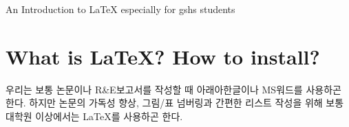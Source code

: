 \documentclass[11pt]{article}
\renewcommand\thesection{\Roman{section}.} %
\renewcommand\thesubsection{\arabic{subsection}.} %
\newtheorem{praise}{찬양}
\begin{document}
\begin{center}
	\Large An Introduction to \LaTeX 
	\small especially for gshs students
\end{center}

\begin{abstract}
	\LaTeX practice during August 2nd $\sim$ 4th. Special thanks to HLETRD.
	
	\begin{large}
	An-Introduction-to-LaTeX
	논문작성을 위한 LaTeX 입문서를 LaTeX로 제작한 것입니다.
	
	LaTeX Editor로는 TeXstudio를 추천합니다. 개인적으로 쓰고 있는 것이기도 해서...
	
	http://www.texstudio.org/
	
	TeXworks쓰다가 TeXstudio쓰면 정말 내가 왜 이걸 모르고 있었지 싶음...
	
	TeX에서 한글을 사용하기 위해서는 koTeXlive를 별도로 설치해야 합니다.
	
	www.ktug.org/xe/index.php?mid=install
	
	용량이 1GB정도 되니 주의 바람\\
	\end{large}
	
	
	\begin{praise}
		HLETRD는 31기 선배들 중 \LaTeX 의 최고수이시다.
		저희 32기에게 처음 \LaTeX 를 가르쳐 주시고 class 파일도 만들어주신 정민석 선생님께 감사드립니다.\\
	\end{praise}
	
	
	\textbf{우리의 기초 R\&E는 수학 R\&E가 아닌 LaTeX R\&E이었습니다.}\\
	\begin{flushright}
		-익명
	\end{flushright}
\end{abstract}

\clearpage
\tableofcontents

\clearpage
\listoftables

\clearpage
\listoffigures

\clearpage
\newcommand{\ding}{\textit{Taxicab Hyperbolloid}}
\newcommand{\longline}{=================================}


\section{What is \LaTeX ? How to install?}\label{intro}
우리는 보통 논문이나 R\&E보고서를 작성할 때 아래아한글이나 MS워드를 사용하곤 한다. 하지만 논문의 가독성 향상, 그림/표 넘버링과 간편한 리스트 작성을 위해 보통 대학원 이상에서는 \LaTeX 를 사용하곤 한다. 
\end{document}
